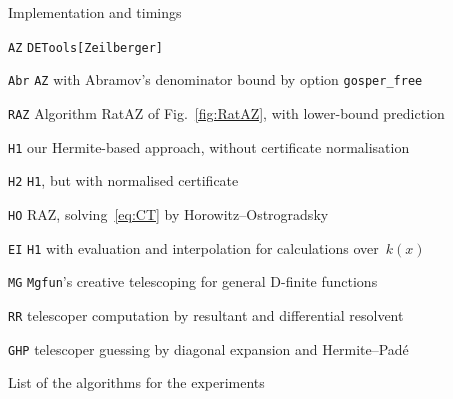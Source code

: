 \documentclass{sig-alt-full}
\begin{document}
\begin{section}{Implementation and timings}
\begin{table}
\vskip-3pt
\begin{scriptsize}
\begin{list}{}{\itemsep-3pt}
\item[\tt AZ] \verb+DETools[Zeilberger]+
\item[\tt Abr] \verb+AZ+ with Abramov's denominator bound by option \verb+gosper_free+
\item[\tt RAZ] Algorithm \textsf{RatAZ} of Fig.~\ref{fig:RatAZ}, with
  lower-bound prediction
\item[\tt H1] our Hermite-based approach, without certificate normalisation
\item[\tt H2] \verb+H1+, but with normalised certificate
\item[\tt HO] \textsf{RAZ}, solving~\eqref{eq:CT} by Horowitz--Ostrogradsky
\item[\tt EI] \verb+H1+ with evaluation and interpolation for calculations over~$k(x)$
\item[\tt MG] \verb+Mgfun+'s creative telescoping for general D-finite functions
\item[\tt RR] telescoper computation by resultant and differential resolvent
\item[\tt GHP] telescoper guessing by diagonal expansion and
  Hermite--Pad\'e
\end{list}
\end{scriptsize}
\vskip-15pt
\caption{List of the algorithms for the experiments}\label{tab:algos}
\vskip-10pt
\end{table}

\end{section}
\end{document}
